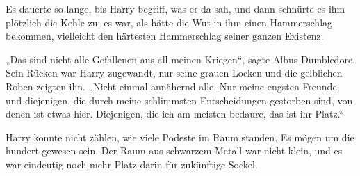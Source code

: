 Es dauerte so lange, bis Harry begriff, was er da sah, und dann schnürte es ihm plötzlich die Kehle zu; es war, als hätte die Wut in ihm einen Hammerschlag bekommen, vielleicht den härtesten Hammerschlag seiner ganzen Existenz.

„Das sind nicht alle Gefallenen aus all meinen Kriegen“, sagte Albus Dumbledore. Sein Rücken war Harry zugewandt, nur seine grauen Locken und die gelblichen Roben zeigten ihn.
„Nicht einmal annähernd alle. Nur meine engsten Freunde, und diejenigen, die durch meine schlimmsten Entscheidungen gestorben sind, von denen ist etwas hier. Diejenigen, die ich am meisten bedaure, das ist ihr Platz.“

Harry konnte nicht zählen, wie viele Podeste im Raum standen. Es mögen um die hundert gewesen sein. Der Raum aus schwarzem Metall war nicht klein, und es war eindeutig noch mehr Platz darin für zukünftige Sockel.


